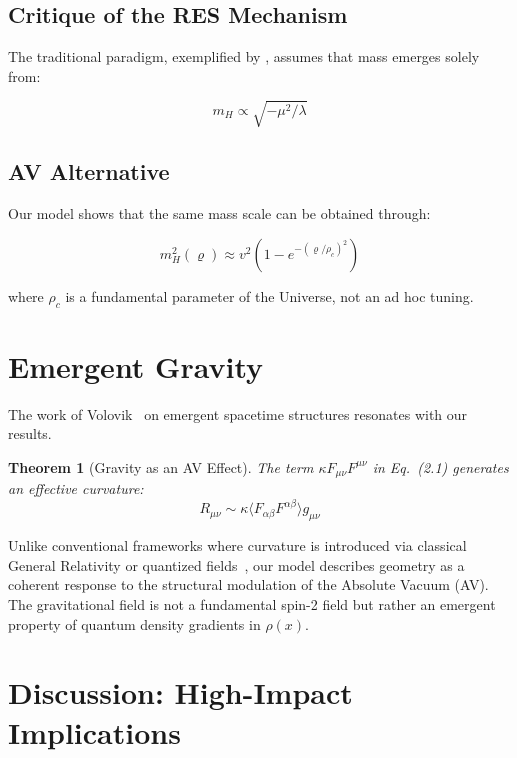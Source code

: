 \documentclass[twoside]{article}
\newtheorem{theorem}{Theorem}[section]
\theoremstyle{definition}
\theoremstyle{remark}
\numberwithin{equation}{section}
\theoremstyle{definition}
\theoremstyle{example}
\theoremstyle{remark}
\numberwithin{equation}{section}%
\begin{document}
	\subsection{Critique of the RES Mechanism}
	
	The traditional paradigm, exemplified by \cite{Wilczek2013}, assumes that mass emerges solely from:
	
	\begin{equation}
		m_H \propto \sqrt{-\mu^2/\lambda}
	\end{equation}
	
	\subsection{AV Alternative}
	
	Our model shows that the same mass scale can be obtained through:
	
	\begin{equation}
		m_H^2(\varrho) \approx v^2(1 - e^{-(\varrho/\rho_c)^2})
	\end{equation}
	
	where $\rho_c$ is a fundamental parameter of the Universe, not an ad hoc tuning.
	
\section*{Emergent Gravity}

The work of Volovik~\cite{volovik2003} on emergent spacetime structures resonates with our results.

\begin{theorem}[Gravity as an AV Effect]
	The term \( \kappa F_{\mu\nu}F^{\mu\nu} \) in Eq.~(2.1) generates an effective curvature:
	\begin{equation}
		R_{\mu\nu} \sim \kappa \langle F_{\alpha\beta}F^{\alpha\beta} \rangle g_{\mu\nu}
	\end{equation}
\end{theorem}

Unlike conventional frameworks where curvature is introduced via classical General Relativity or quantized fields~\cite{rovelli2018}, our model describes geometry as a coherent response to the structural modulation of the Absolute Vacuum (AV). The gravitational field is not a fundamental spin-2 field but rather an emergent property of quantum density gradients in \( \rho(x) \).

	
	\section{Discussion: High-Impact Implications}
	
\end{document}
